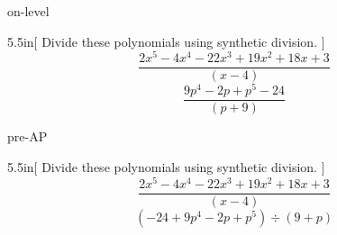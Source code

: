 \begin{taggedblock}{on-level}
    \begin{my2Problems}[\large]{5.5in}[
        Divide these polynomials using synthetic division.
        ]
        {
            \begin{equation*}
                \frac
                    {2x^5 - 4x^4 -22x^3 + 19x^2 + 18x + 3}
                    {(x-4)}
            \end{equation*}
        }
        {
            \begin{equation*}
                \frac
                    {9p^4 -2p + p^5 -24}
                    {(p+9)}
            \end{equation*}
        }
    \end{my2Problems}
    \end{taggedblock}
    
\begin{taggedblock}{pre-AP}
\begin{my2Problems}[\large]{5.5in}[
    Divide these polynomials using synthetic division.
    ]
    {
        \begin{equation*}
            \frac
                {2x^5 - 4x^4 -22x^3 + 19x^2 + 18x + 3}
                {(x-4)}
        \end{equation*}
    }
    {
        \begin{equation*}
            {(-24 + 9p^4 -2p + p^5)}
            \div
            {(9+p)}
        \end{equation*}
    }
\end{my2Problems}
\end{taggedblock}
